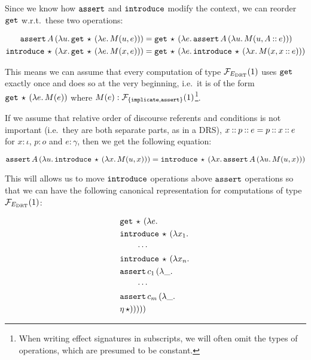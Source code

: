 Since we know how $\mathtt{assert}$ and $\mathtt{introduce}$ modify the context, we
can reorder $\mathtt{get}$ w.r.t.\ these two operations:

\begin{align*}
   \mathtt{assert}\,A\,(\lambda u.\, \mathtt{get}\,\star\,(\lambda e.\, M(u, e)))
&= \mathtt{get}\,\star\,(\lambda e.\, \mathtt{assert}\,A\,(\lambda u.\, M(u, A \mathbin{::} e))) \\
   \mathtt{introduce}\,\star\,(\lambda x.\, \mathtt{get}\,\star\,(\lambda e.\, M(x, e)))
&= \mathtt{get}\,\star\,(\lambda e.\, \mathtt{introduce}\,\star\,(\lambda x.\, M(x, x \mathbin{::} e))) \\
\end{align*}

This means we can assume that every computation of type $\mathcal{F}_{E_{\mathrm{DRT}}}(1)$
uses $\mathtt{get}$ exactly once and does so at the very beginning, i.e.\ it is
of the form $\mathtt{get}\,\star\,(\lambda e.\, M(e))$ where
$M(e) : \mathcal{F}_{\{\mathtt{implicate}, \mathtt{assert}\}}(1)$\footnote{When writing
  effect signatures in subscripts, we will often omit the types of
  operations, which are presumed to be constant.}.

If we assume that relative order of discourse referents and conditions is
not important (i.e.\ they are both separate parts, as in a DRS),
$x \mathbin{::} p \mathbin{::} e = p \mathbin{::} x \mathbin{::} e$ for $x : \iota$, $p : o$ and
$e : \gamma$, then we get the following equation:

$$
  \mathtt{assert}\,A\,(\lambda u.\, \mathtt{introduce}\,\star\,(\lambda x.\, M(u, x))) 
= \mathtt{introduce}\,\star\,(\lambda x.\, \mathtt{assert}\,A\,(\lambda u.\, M(u, x)))
$$

This will allows us to move $\mathtt{introduce}$ operations above $\mathtt{assert}$
operations so that we can have the following canonical representation for
computations of type $\mathcal{F}_{E_{\mathrm{DRT}}}(1)$:

\begin{align*}
  &\mathtt{get}\,\star\,(\lambda e.\,  \\
  &\mathtt{introduce}\,\star\,(\lambda x_1.\,  \\
  &\qquad \cdots \\
  &\mathtt{introduce}\,\star\,(\lambda x_n.\,  \\
  &\mathtt{assert}\,c_1\,(\lambda \_.\,  \\
  &\qquad \cdots \\
  &\mathtt{assert}\,c_m\,(\lambda \_.\,  \\
  &\eta\,\star)))))
\end{align*}


